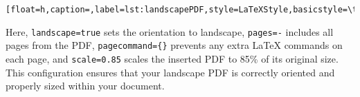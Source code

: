 		\begin{lstlisting}[float=h,caption=,label=lst:landscapePDF,style=LaTeXStyle,basicstyle=\ttfamily,]

		\end{lstlisting}
		
		Here, \lstinline|landscape=true| sets the orientation to landscape, \lstinline|pages=-| includes all pages from the PDF, \lstinline|pagecommand={}| prevents any extra LaTeX commands on each page, and \lstinline|scale=0.85| scales the inserted PDF to 85\% of its original size. 
		This configuration ensures that your landscape PDF is correctly oriented and properly sized within your document.
		
		